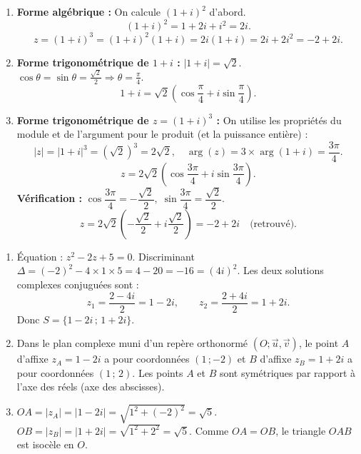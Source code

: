 \documentclass[11pt]{article}
\newcommand{\cle}[1]{{\popxbold\color{popdark}#1}}
\begin{document}
\begin{corrige}
\begin{enumerate}
\item \textbf{Forme algébrique :} On calcule $(1+i)^2$ d'abord.
\[ (1+i)^2 = 1 + 2i + i^2 = 2i. \]
\[ z = (1+i)^3 = (1+i)^2(1+i) = 2i(1+i) = 2i + 2i^2 = -2 + 2i. \]
\item \textbf{Forme trigonométrique de $1+i$ :} $|1+i| = \sqrt{2}$. $\cos\theta = \sin\theta = \frac{\sqrt{2}}{2} \Rightarrow \theta = \frac{\pi}{4}$.
\[ 1+i = \sqrt{2}\left(\cos\dfrac{\pi}{4} + i\sin\dfrac{\pi}{4}\right). \]
\item \textbf{Forme trigonométrique de $z = (1+i)^3$ :} On utilise les propriétés du module et de l'argument pour le produit (et la puissance entière) :
\[ |z| = |1+i|^3 = (\sqrt{2})^3 = 2\sqrt{2}, \quad \arg(z) = 3 \times \arg(1+i) = \dfrac{3\pi}{4}. \]
\[ z = 2\sqrt{2}\left(\cos\dfrac{3\pi}{4} + i\sin\dfrac{3\pi}{4}\right). \]
\textbf{Vérification :} $\cos\dfrac{3\pi}{4} = -\dfrac{\sqrt{2}}{2},\; \sin\dfrac{3\pi}{4} = \dfrac{\sqrt{2}}{2}$.
\[ z = 2\sqrt{2}\left(-\dfrac{\sqrt{2}}{2} + i\dfrac{\sqrt{2}}{2}\right) = -2 + 2i \quad \text{(retrouvé)}. \]
\end{enumerate}
\end{corrige}

\begin{corrige}
\begin{enumerate}
\item Équation : $z^2 - 2z + 5 = 0$. Discriminant $\Delta = (-2)^2 - 4 \times 1 \times 5 = 4 - 20 = -16 = (4i)^2$.
Les deux solutions complexes conjuguées sont :
\[ z_1 = \dfrac{2 - 4i}{2} = 1 - 2i, \qquad z_2 = \dfrac{2 + 4i}{2} = 1 + 2i. \]
Donc $S = \{1 - 2i\,;\, 1 + 2i\}$.
\item Dans le plan complexe muni d'un repère orthonormé $(O; \vec{u}, \vec{v})$, le point $A$ d'affixe $z_A = 1 - 2i$ a pour coordonnées $(1\,;-2)$ et $B$ d'affixe $z_B = 1 + 2i$ a pour coordonnées $(1\,;\,2)$. Les points $A$ et $B$ sont symétriques par rapport à l'axe des réels (axe des abscisses).
\item $OA = |z_A| = |1 - 2i| = \sqrt{1^2 + (-2)^2} = \sqrt{5}$.
$OB = |z_B| = |1 + 2i| = \sqrt{1^2 + 2^2} = \sqrt{5}$.
Comme $OA = OB$, le triangle $OAB$ est \cle{isocèle en $O$}.
\end{enumerate}
\end{corrige}
\end{document}
